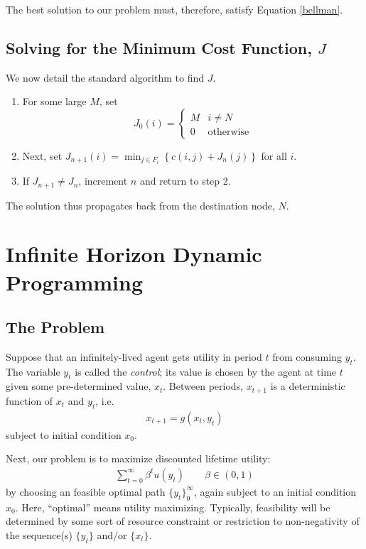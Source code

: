 \documentclass[a4paper,12pt]{scrartcl}
\begin{document}
The best solution to our problem must, therefore, satisfy Equation
\ref{bellman}.

\subsection{Solving for the Minimum Cost Function, $J$}

We now detail the standard algorithm to find $J$.
\begin{enumerate}
    \item For some large $M$, set
	\begin{equation}
	    J_0(i) = \begin{cases} M & i \neq N \\ 
				    0 & \text{otherwise}
		    \end{cases}
	\end{equation}

    \item Next, set 
	$J_{n+1}(i) = \min_{j \in F_i} \left\{ c(i,j) + J_n(j)\right\}$
	for all $i$.

    \item If $J_{n+1} \neq J_n$, increment $n$ and return to step 2.

\end{enumerate}
The solution thus propagates back from the destination node, $N$.


\section{Infinite Horizon Dynamic Programming}

\subsection{The Problem}

Suppose that an infinitely-lived agent gets utility in period
$t$ from consuming $y_t$. The variable $y_t$ is called the
\emph{control}; its value is chosen by the agent at time $t$
given some pre-determined value, $x_t$. Between periods,
$x_{t+1}$ is a deterministic function of $x_t$ and $y_t$, i.e.
\begin{align}
  \label{xevol}
  x_{t+1} = g(x_t, y_t)
\end{align}
subject to initial condition $x_0$.

Next, our problem is to maximize discounted lifetime utility: 
\begin{align}
  \label{toughproblem}
  \sum^\infty_{t=0} \beta^t u(y_t)
  \qquad \beta\in (0,1)
\end{align}
by choosing an feasible optimal path $\{ y_t \}_0^\infty$, again
subject to an initial condition $x_0$.  Here,
``optimal'' means utility maximizing. Typically, feasibility
will be determined by some sort of resource constraint or
restriction to non-negativity of the sequence(s) $\{ y_t \}$
and/or $\{x_t\}$. 
\end{document}
